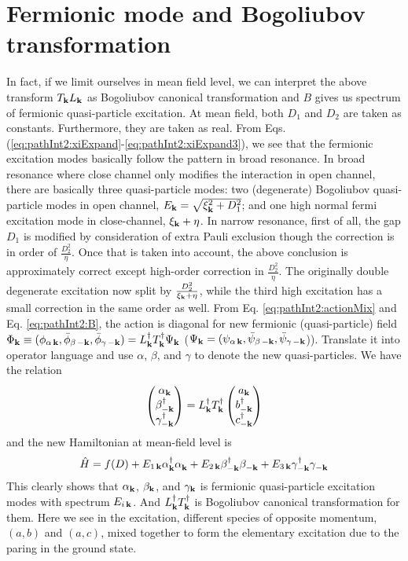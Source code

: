 \section{Fermionic mode and Bogoliubov transformation}
In fact, if we limit ourselves in mean field level, we can interpret the above transform $T_{\mathbf{k}}{}L_{\mathbf{k}}$ as Bogoliubov canonical transformation and $B$ gives us spectrum of fermionic quasi-particle excitation.  At mean field, both $D_{1}$ and $D_{2}$ are taken as constants. Furthermore, they are taken as real.  From Eqs. (\ref{eq:pathInt2:xiExpand}-\ref{eq:pathInt2:xiExpand3}), we see that the fermionic excitation modes basically follow the pattern in broad resonance.  In broad resonance where close channel only modifies the interaction in open channel,  there are basically three quasi-particle modes: two (degenerate) Bogoliubov quasi-particle modes  in open channel, $E_{\mathbf{k}}=\sqrt{\xi^{2}_{\mathbf{k}}+D_{1}^{2}}$; and one high normal fermi excitation mode in close-channel, $\xi_{\mathbf{k}}+\eta$.  In narrow resonance, first of all, the gap $D_{1}$ is modified  by consideration of extra Pauli exclusion though the correction is in order of $\frac{D_2^2}{\eta}$.  Once that is taken into account, the above conclusion is approximately correct except high-order correction in $\frac{D_{2}^{2}}{\eta}$.   The originally double degenerate excitation now split by $\frac{D_{2}^{2}}{\xi_{\mathbf{k}}+\eta}$, while the third high excitation has a small correction in the same order as well.  From Eq. \eqref{eq:pathInt2:actionMix} and Eq. \eqref{eq:pathInt2:B}, the action is diagonal for new fermionic (quasi-particle) field $\Phi_{\mathbf{k}}\equiv(\phi_{\alpha\,\mathbf{k}},\bar\phi_{\beta\,-\mathbf{k}},\bar\phi_{\gamma\,-\mathbf{k}})=L^{\dagger}_{\mathbf{k}}T^{\dagger}_{\mathbf{k}}\Psi_{\mathbf{k}}$ ($\Psi_{\mathbf{k}}=(\psi_{\alpha\,\mathbf{k}},\bar\psi_{\beta\,-\mathbf{k}},\bar\psi_{\gamma\,-\mathbf{k}}$)).   Translate it into operator language and use $\alpha$, $\beta$, and $\gamma$ to denote the new quasi-particles.  We have the relation
\begin{equation}
\begin{pmatrix}\alpha_{\mathbf{k}}\\\beta_{-\mathbf{k}}^{\dagger}\\\gamma_{-\mathbf{k}}^{\dagger}\end{pmatrix}
=L^{\dagger}_{\mathbf{k}}T^{\dagger}_{\mathbf{k}}  \begin{pmatrix}a_{\mathbf{k}}\\b_{-\mathbf{k}}^{\dagger}\\c_{-\mathbf{k}}^{\dagger}\end{pmatrix}
\end{equation}   
and the new Hamiltonian at mean-field level is 
\begin{equation}
\hat{H}=f(D)+E_{1\,\mathbf{k}}\alpha^{\dagger}_{\mathbf{k}}\alpha^{}_{\mathbf{k}}
+E_{2\,\mathbf{k}}\beta^{\dagger}_{-\mathbf{k}}\beta^{}_{-\mathbf{k}}+E_{3\,\mathbf{k}}\gamma^{\dagger}_{-\mathbf{k}}\gamma^{}_{-\mathbf{k}}
\end{equation}
This clearly shows that $\alpha_{\mathbf{k}}$, $\beta_{\mathbf{k}}$, and $\gamma_{\mathbf{k}}$ is fermionic quasi-particle excitation modes with spectrum $E_{i\,\mathbf{k}}$.  And $L^{\dagger}_{\mathbf{k}}T^{\dagger}_{\mathbf{k}}$ is  Bogoliubov canonical transformation for them.  Here we see in the excitation, different species of opposite momentum, $(a,b)$ and $(a,c)$, mixed together to form the elementary excitation due to the paring in the ground state.  




